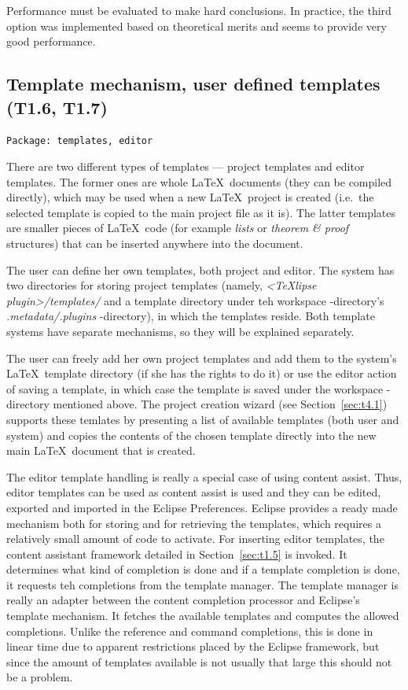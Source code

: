 \documentclass[a4paper,11pt,twoside]{article}
\begin{document}
Performance must be evaluated to make hard conclusions. In practice, the third 
option was implemented based on theoretical merits and seems to provide very 
good performance.


\subsection{Template mechanism, user defined templates (T1.6, T1.7)}

\texttt{Package: templates, editor}

There are two different types of templates --- project templates and editor 
templates. The former ones are whole \LaTeX\ documents (they can be compiled 
directly), which may be used when a new \LaTeX\ project is created (i.e.\ the
selected template is copied to the main project file as it is). The latter 
templates are smaller pieces of \LaTeX\ code (for example \emph{lists} or 
\emph{theorem \& proof} structures) that can be inserted anywhere into the 
document.

The user can define her own templates, both project and editor. The system has 
two directories for storing project templates (namely, \emph{<TeXlipse 
plugin>/templates/} and a template directory under teh workspace -directory's 
\emph{.metadata/.plugins} -directory), in which the templates reside. Both
template systems have separate mechanisms, so they will be explained separately.

The user can freely add her own project templates and add them to the system's 
\LaTeX\ template directory (if she has the rights to do it) or use the editor 
action of saving a template, in which case the template is saved under the 
workspace -directory mentioned above. The project creation wizard (see
Section~\ref{sec:t4.1}) supports these temlates by presenting a list of
available templates (both user and system) and copies the contents of the chosen
template directly into the new main \LaTeX\ document that is created.

The editor template handling is really a special case of using content assist. 
Thus, editor templates can be used as content assist is used and they can be 
edited, exported and imported in the Eclipse Preferences. Eclipse provides a
ready made mechanism both for storing and for retrieving the templates, which
requires a relatively small amount of code to activate. For inserting editor
templates, the content assistant framework detailed in Section~\ref{sec:t1.5} is
invoked. It determines what kind of completion is done and if a template
completion is done, it requests teh completions from the template manager. The
template manager is really an adapter between the content completion processor
and Eclipse's template mechanism. It fetches the available templates and
computes the allowed completions. Unlike the reference and command completions,
this is done in linear time due to apparent restrictions placed by the Eclipse
framework, but since the amount of templates available is not usually that large
this should not be a problem.
\end{document}
